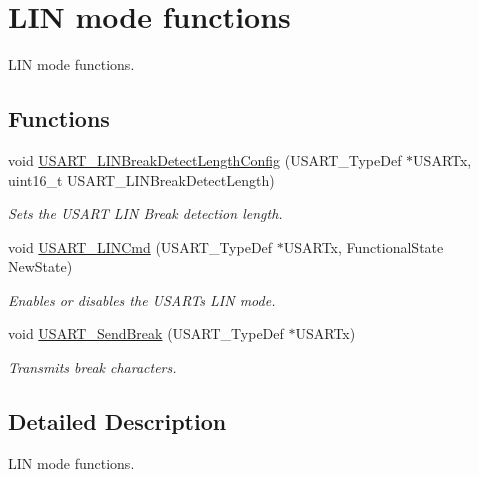 \hypertarget{group___u_s_a_r_t___group4}{}\section{L\+IN mode functions}
\label{group___u_s_a_r_t___group4}


L\+IN mode functions.  


\subsection*{Functions}
\begin{DoxyCompactItemize}
\item 
void \mbox{\hyperlink{group___u_s_a_r_t___group4_ga7bc2d291831cbc5e53e73337308029b5}{U\+S\+A\+R\+T\+\_\+\+L\+I\+N\+Break\+Detect\+Length\+Config}} (U\+S\+A\+R\+T\+\_\+\+Type\+Def $\ast$U\+S\+A\+R\+Tx, uint16\+\_\+t U\+S\+A\+R\+T\+\_\+\+L\+I\+N\+Break\+Detect\+Length)
\begin{DoxyCompactList}\small\item\em Sets the U\+S\+A\+RT L\+IN Break detection length. \end{DoxyCompactList}\item 
void \mbox{\hyperlink{group___u_s_a_r_t___group4_ga9fdd6296f4ca4acdfcbd58bf56bd4185}{U\+S\+A\+R\+T\+\_\+\+L\+I\+N\+Cmd}} (U\+S\+A\+R\+T\+\_\+\+Type\+Def $\ast$U\+S\+A\+R\+Tx, Functional\+State New\+State)
\begin{DoxyCompactList}\small\item\em Enables or disables the U\+S\+A\+RT\textquotesingle{}s L\+IN mode. \end{DoxyCompactList}\item 
void \mbox{\hyperlink{group___u_s_a_r_t___group4_ga39a3d33e23ee28529fa8f7259ce6811e}{U\+S\+A\+R\+T\+\_\+\+Send\+Break}} (U\+S\+A\+R\+T\+\_\+\+Type\+Def $\ast$U\+S\+A\+R\+Tx)
\begin{DoxyCompactList}\small\item\em Transmits break characters. \end{DoxyCompactList}\end{DoxyCompactItemize}


\subsection{Detailed Description}
L\+IN mode functions. 

